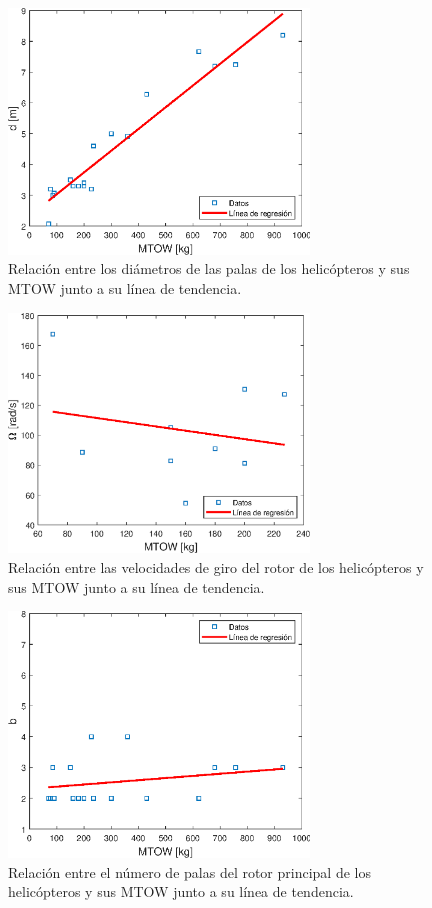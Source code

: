 \begin{figure}
	\centering
	\includegraphics[width=80mm]{graficos/anald}
	\caption{Relación entre los diámetros de las palas de los helicópteros y sus MTOW junto a su línea de tendencia.}
	\label{diamAS}
\end{figure}
\begin{figure}
	\centering
	\includegraphics[width=80mm]{graficos/analomega}
	\caption{Relación entre las velocidades de giro del rotor de los helicópteros y sus MTOW junto a su línea de tendencia.}
	\label{omegaAS}
\end{figure}
\begin{figure}
	\centering
	\includegraphics[width=80mm]{graficos/analb}
	\caption{Relación entre el número de palas del rotor principal de los helicópteros y sus MTOW junto a su línea de tendencia.}
	\label{bAS}
\end{figure}
